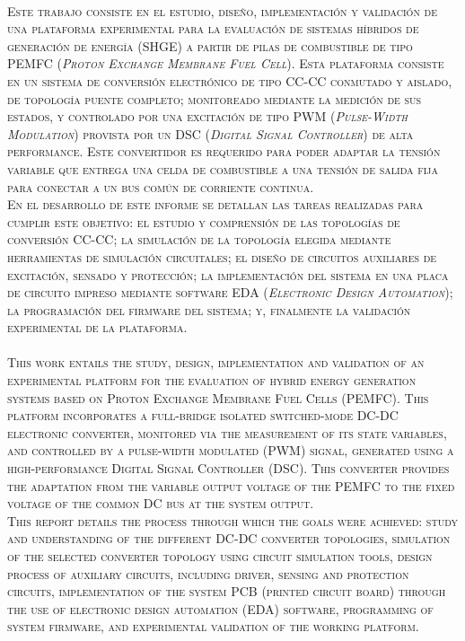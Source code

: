 \huge
\scshape\color{AzulFI_dark}
\\

\normalfont\normalsize\normalcolor
Este trabajo consiste en el estudio, diseño, implementación y validación de una plataforma experimental para la evaluación de sistemas híbridos de generación de energía (SHGE) a partir de pilas de combustible de tipo PEMFC (\textit{Proton Exchange Membrane Fuel Cell}). Esta plataforma consiste en un sistema de conversión electrónico de tipo CC-CC conmutado y aislado, de topología puente completo; monitoreado mediante la medición de sus estados, y controlado por una excitación de tipo PWM (\textit{Pulse-Width Modulation}) provista por un DSC (\textit{Digital Signal Controller}) de alta performance. Este convertidor es requerido para poder adaptar la tensión variable que entrega una celda de combustible a una tensión de salida fija para conectar a un bus común de corriente continua.\\

En el desarrollo de este informe se detallan las tareas realizadas para cumplir este objetivo: el estudio y comprensión de las topologías de conversión CC-CC; la simulación de la topología elegida mediante herramientas de simulación circuitales; el diseño de circuitos auxiliares de excitación, sensado y protección; la implementación del sistema en una placa de circuito impreso mediante software EDA (\textit{Electronic Design Automation}); la programación del firmware del sistema; y, finalmente la validación experimental de la plataforma.\\

\vspace{1cm}
\huge
\scshape\color{AzulFI_dark}
\\

\normalsize\normalfont\normalcolor
This work entails the study, design, implementation and validation of an experimental platform for the evaluation of hybrid energy generation systems based on Proton Exchange Membrane Fuel Cells (PEMFC). This platform incorporates a full-bridge isolated switched-mode DC-DC electronic converter, monitored via the measurement of its state variables, and controlled by a pulse-width modulated (PWM) signal, generated using a high-performance Digital Signal Controller (DSC). This converter provides the adaptation from the variable output voltage of the PEMFC to the fixed voltage of the common DC bus at the system output.\\

This report details the process through which the goals were achieved: study and understanding of the different DC-DC converter topologies, simulation of the selected converter topology using circuit simulation tools, design process of auxiliary circuits, including driver, sensing and protection circuits,  implementation of the system PCB (printed circuit board) through the use of electronic design automation (EDA) software, programming of system firmware, and experimental validation of the working platform.\\ 